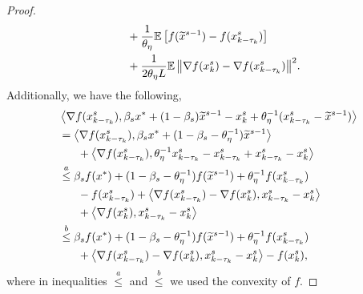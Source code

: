 \begin{proof}
\begin{equation}
\begin{split}
&~~~+\frac{1}{\theta_{\eta}}\mathbb{E}\left[f(\widetilde{x}^{s-1})-f({x}_{k-\tau_k}^{s})\right]\\
&~~~+{\frac{1}{2 \theta_{\eta} L} \mathbb{E}\left\lVert\nabla f(x_{k}^s)-\nabla f(x_{k-\tau_k}^s)\right\rVert^2}.
\end{split}
\end{equation}
Additionally, we have the following,
\begin{equation}\label{Eq4-Lemma1}
\begin{split}
&\Iprod{\nabla f(x_{k-\tau_k}^s)}{\beta_sx^*+(1-\beta_s)\widetilde{x}^{s-1}-{x}^{s}_{k}+\theta_{\eta}^{-1}(x_{k-\tau_k}^s-\widetilde{x}^{s-1})}\\
&=\Iprod{\nabla f(x_{k-\tau_k}^s)}{\beta_sx^*+(1-\beta_s-\theta_{\eta}^{-1})\widetilde{x}^{s-1}}\\
&~~~~~+\Iprod{\nabla f(x_{k-\tau_k}^s)}{\theta_{\eta}^{-1}x_{k-\tau_k}^s-x_{k-\tau_k}^s+x_{k-\tau_k}^s-{x}^{s}_{k}}\\
&\stackrel{a}{\leq} \beta_sf(x^*)+(1-\beta_s-\theta_{\eta}^{-1})f(\widetilde{x}^{s-1})+\theta_{\eta}^{-1}f(x_{k-\tau_k}^s)\\
&~~~~~-f(x_{k-\tau_k}^s)+\Iprod{\nabla f(x_{k-\tau_k}^s)-\nabla f(x_{k}^s)}{x_{k-\tau_k}^s-{x}^{s}_{k}}\\
&~~~~~+\Iprod{\nabla f(x_{k}^s)}{x_{k-\tau_k}^s-{x}^{s}_{k}}\\
&\stackrel{b}{\leq} \beta_sf(x^*)+(1-\beta_s-\theta_{\eta}^{-1})f(\widetilde{x}^{s-1})+\theta_{\eta}^{-1}f(x_{k-\tau_k}^s)\\
&~~~~~+\Iprod{\nabla f(x_{k-\tau_k}^s)-\nabla f(x_{k}^s)}{x_{k-\tau_k}^s-{x}^{s}_{k}}- f(x_{k}^s),
\end{split}
\raisetag{15pt}
\end{equation}
where in inequalities $\stackrel{a}{\leq}$ and $\stackrel{b}{\leq}$ we used the convexity of $f$. 


\end{proof}
